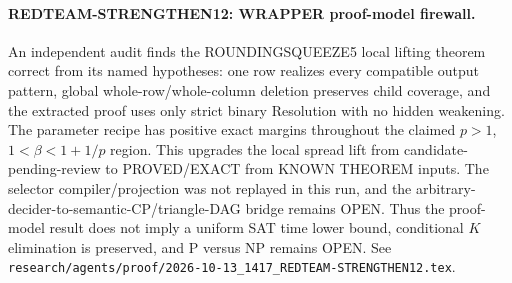 \paragraph{REDTEAM-STRENGTHEN12: WRAPPER proof-model firewall.}
An independent audit finds the ROUNDINGSQUEEZE5 local lifting theorem correct
from its named hypotheses: one row realizes every compatible output pattern,
global whole-row/whole-column deletion preserves child coverage, and the
extracted proof uses only strict binary Resolution with no hidden weakening.
The parameter recipe has positive exact margins throughout the claimed
$p>1$, $1<\beta<1+1/p$ region.  This upgrades the local spread lift from
candidate-pending-review to PROVED/EXACT from KNOWN THEOREM inputs.  The
selector compiler/projection was not replayed in this run, and the
arbitrary-decider-to-semantic-CP/triangle-DAG bridge remains OPEN.  Thus the
proof-model result does not imply a uniform SAT time lower bound, conditional
$K$ elimination is preserved, and P versus NP remains OPEN.  See
\texttt{research/agents/proof/2026-10-13\_1417\_REDTEAM-STRENGTHEN12.tex}.
